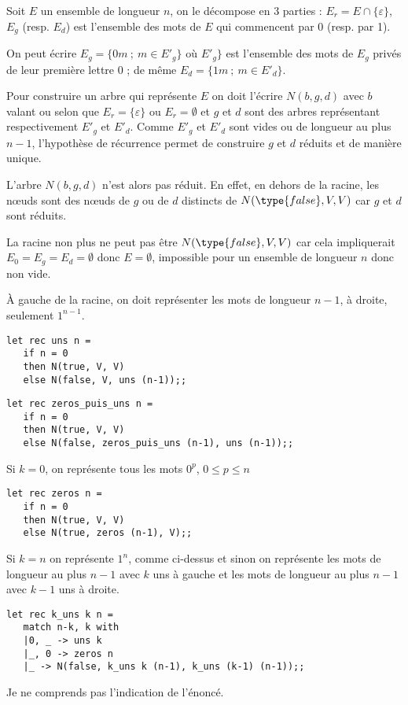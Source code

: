 \begin{Exercise}
\begin{itemize}
    Soit $E$ un ensemble de longueur $n$,  on le décompose en 3 parties : $E_r = E\cap \{\varepsilon\}$, $E_g$ (resp. $E_d$) est l'ensemble des mots de $E$ qui commencent par 0 (resp. par 1).
    
    On peut écrire $E_g = \{0m\ ;\ m\in E'_g\}$ où $E'_g\}$ est l'ensemble des mots de $E_g$ privés de leur première lettre 0 ; de même $E_d = \{1m\ ;\ m\in E'_d\}$.
    
    Pour construire un arbre qui représente $E$ on doit l'écrire $N(b, g, d)$ avec $b$ valant  ou  selon que $E_r=\{\varepsilon\}$ ou $E_r=\emptyset$ et $g$ et $d$ sont des arbres représentant respectivement $E'_g$ et $E'_d$. Comme $E'_g$ et $E'_d$ sont vides ou de longueur au plus $n-1$, l'hypothèse de récurrence permet de construire $g$ et $d$ réduits et de manière unique. 
    
    L'arbre $N(b, g, d)$ n'est alors pas réduit. En effet, en dehors de la racine, les nœuds sont des nœuds de $g$ ou de $d$ distincts de $N(\type{false}, V, V)$ car $g$ et $d$ sont réduits.
    
    La racine non plus ne peut pas être $N(\type{false}, V, V)$ car cela impliquerait $E_0=E_g=E_d=\emptyset$ donc $E = \emptyset$, impossible pour un ensemble de longueur $n$ donc non vide.
\end{itemize}
\end{Exercise} 
\begin{Exercise}À gauche de la racine, on doit représenter les mots de longueur $n-1$, à droite, seulement $1^{n-1}$.
\begin{lstlisting}
let rec uns n =
   if n = 0
   then N(true, V, V)
   else N(false, V, uns (n-1));;
\end{lstlisting}
\begin{lstlisting}
let rec zeros_puis_uns n =
   if n = 0
   then N(true, V, V)
   else N(false, zeros_puis_uns (n-1), uns (n-1));;
\end{lstlisting}
\end{Exercise} 
\begin{Exercise}Si $k = 0$, on représente tous les mots $0^p$, $0\le p \le n$
\begin{lstlisting}
let rec zeros n =
   if n = 0
   then N(true, V, V)
   else N(true, zeros (n-1), V);;
\end{lstlisting}
Si $k=n$ on représente $1^n$, comme ci-dessus et sinon on représente les mots de longueur au plus $n-1$ avec $k$ uns à gauche et les mots de longueur au plus $n-1$ avec $k-1$ uns à droite.
\begin{lstlisting}
let rec k_uns k n = 
   match n-k, k with
   |0, _ -> uns k
   |_, 0 -> zeros n
   |_ -> N(false, k_uns k (n-1), k_uns (k-1) (n-1));;
\end{lstlisting}
Je ne comprends pas l'indication de l'énoncé.
\end{Exercise} 

